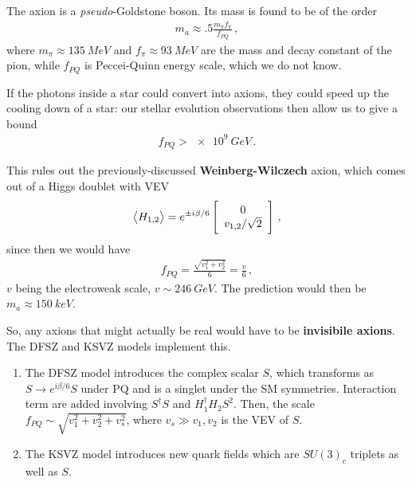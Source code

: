 \documentclass[main.tex]{subfiles}
\begin{document}

The axion is a \emph{pseudo}-Goldstone boson. Its mass is found to be of the order 
%
\begin{align}
m_{a} \approx \num{.5} \frac{m_\pi f_\pi }{f_{PQ}}
\,,
\end{align}
%
where \(m_\pi \approx \SI{135}{MeV} \) and \(f_\pi \approx \SI{93}{MeV} \) are the mass and decay constant of the pion, while \(f_{PQ}\) is Peccei-Quinn energy scale, which we do not know.

If the photons inside a star could convert into axions, they could speed up the cooling down of a star: our stellar evolution observations then allow us to give a bound
%
\begin{align}
f_{PQ} > \SI{e9}{GeV}
\,.
\end{align}

This rules out the previously-discussed \textbf{Weinberg-Wilczech} axion, which comes out of a Higgs doublet with VEV 
%
\begin{align}
\expval{H_{1,2}} = e^{\pm i \beta /6 } \left[\begin{array}{c}
0 \\ 
v_{1, 2} / \sqrt{2}
\end{array}\right]
\,,
\end{align}
%
since then we would have 
%
\begin{align}
f_{PQ} = \frac{\sqrt{v_1^2 + v_2^2}}{6} = \frac{v}{6}
\,,
\end{align}
%
\(v\) being the electroweak scale, \(v \sim \SI{246}{GeV}\).
The prediction would then be \(m_a \approx \SI{150}{keV}\).

So, any axions that might actually be real would have to be \textbf{invisibile axions}. The DFSZ and KSVZ models implement this.
\begin{enumerate}
    \item The DFSZ model introduces the complex scalar \(S\), which transforms as \(S \to e^{i \beta /6} S\) under PQ and is a singlet under the SM symmetries. Interaction term are added involving \(S ^\dag S\) and \(H_1 ^\dag H_2 S^2\).
    Then, the scale \(f_{PQ} \sim \sqrt{v_1^2 + v_2^2 + v_s^2}\), where \(v_s \gg v_1 , v_2 \) is the VEV of \(S\). 
    \item The KSVZ model introduces new quark fields which are \(SU(3)_c\) triplets as well as \(S\). 
\end{enumerate}
\end{document}
